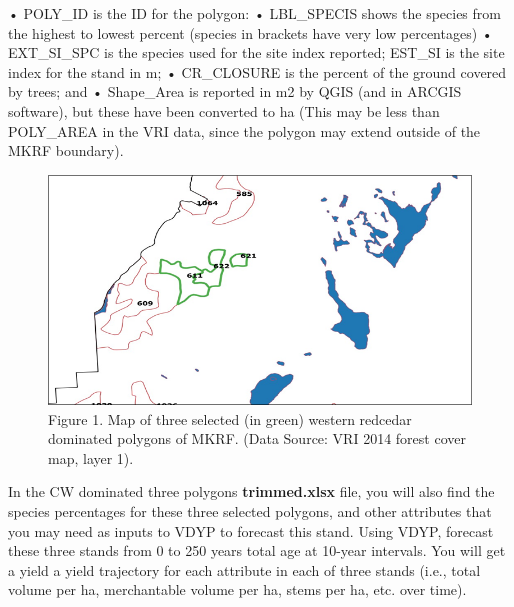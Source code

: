 \documentclass[
  letterpaper,
]{book}
\begin{document}
\begin{tcolorbox}[enhanced jigsaw, colbacktitle=quarto-callout-note-color!10!white, leftrule=.75mm, left=2mm, opacitybacktitle=0.6, breakable, colframe=quarto-callout-note-color-frame, arc=.35mm, bottomtitle=1mm, rightrule=.15mm, title=\textcolor{quarto-callout-note-color}{\faInfo}\hspace{0.5em}{Table Notes}, toptitle=1mm, titlerule=0mm, opacityback=0, coltitle=black, colback=white, bottomrule=.15mm, toprule=.15mm]

• POLY\_ID is the ID for the polygon: • LBL\_SPECIS shows the species
from the highest to lowest percent (species in brackets have very low
percentages) • EXT\_SI\_SPC is the species used for the site index
reported; EST\_SI is the site index for the stand in m; • CR\_CLOSURE is
the percent of the ground covered by trees; and • Shape\_Area is
reported in m2 by QGIS (and in ARCGIS software), but these have been
converted to ha (This may be less than POLY\_AREA in the VRI data, since
the polygon may extend outside of the MKRF boundary).

\end{tcolorbox}

\begin{figure}

{\centering \includegraphics{images/clipboard-1804548772.png}

}

\caption{Figure 1. Map of three selected (in green) western redcedar
dominated polygons of MKRF. (Data Source: VRI 2014 forest cover map,
layer 1).}

\end{figure}

In the CW dominated three polygons \textbf{trimmed.xlsx} file, you will
also find the species percentages for these three selected polygons, and
other attributes that you may need as inputs to VDYP to forecast this
stand. Using VDYP, forecast these three stands from 0 to 250 years total
age at 10-year intervals. You will get a yield a yield trajectory for
each attribute in each of three stands (i.e., total volume per ha,
merchantable volume per ha, stems per ha, etc. over time).
\end{document}

